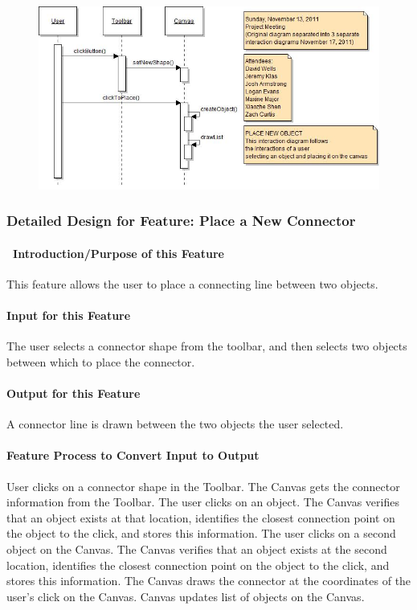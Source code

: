\documentclass[twoside,letterpaper]{article}
\begin{document}
{\begin{figure}[h]
\centering
\includegraphics[width=6.0in]{IntNewObj.jpg}
\end{figure}

\clearpage


\subsubsection{Detailed Design for Feature: Place a New Connector}

\paragraph[\ Introduction/Purpose of this Feature]
{\ Introduction/Purpose of this Feature}
{\color{black}
This feature allows the user to place a connecting line between two objects.
}

\paragraph[Input for this Feature]{Input for this Feature}
{\color{black}
The user selects a connector shape from the toolbar, and then selects two objects between which to place the connector.
}

\paragraph{Output for this Feature}
{\color{black}
A connector line is drawn between the two objects the user selected.
}

\paragraph{Feature Process to Convert Input to Output}
{\color{black}
User clicks on a connector shape in the Toolbar.  
The Canvas gets the connector information from the Toolbar.  
The user clicks on an object.
The Canvas verifies that an object exists at that location, identifies the closest connection point on the object to the click, and stores this information.
The user clicks on a second object on the Canvas.  
The Canvas verifies that an object exists at the second location, identifies the closest connection point on the object to the click, and stores this information.  
The Canvas draws the connector at the coordinates of the user{\textquoteright}s click on the Canvas.  
Canvas updates list of objects on the Canvas.  
}

}
\end{document}
